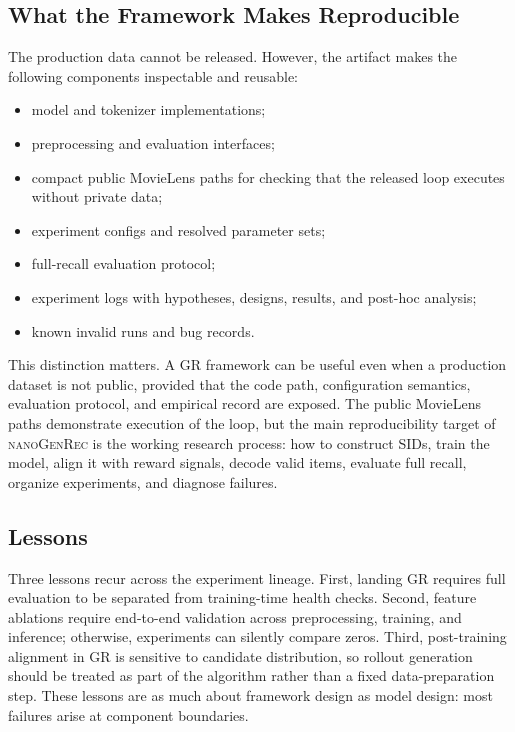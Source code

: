 \documentclass[11pt]{article}
\begin{document}
\subsection{What the Framework Makes Reproducible}

The production data cannot be released. However, the artifact makes the following components inspectable and reusable:

\begin{itemize}
  \item model and tokenizer implementations;
  \item preprocessing and evaluation interfaces;
  \item compact public MovieLens paths for checking that the released loop executes without private data;
  \item experiment configs and resolved parameter sets;
  \item full-recall evaluation protocol;
  \item experiment logs with hypotheses, designs, results, and post-hoc analysis;
  \item known invalid runs and bug records.
\end{itemize}

This distinction matters. A GR framework can be useful even when a production dataset is not public, provided that the code path, configuration semantics, evaluation protocol, and empirical record are exposed. The public MovieLens paths demonstrate execution of the loop, but the main reproducibility target of \textsc{nanoGenRec} is the working research process: how to construct SIDs, train the model, align it with reward signals, decode valid items, evaluate full recall, organize experiments, and diagnose failures.

\subsection{Lessons}

Three lessons recur across the experiment lineage. First, landing GR requires full evaluation to be separated from training-time health checks. Second, feature ablations require end-to-end validation across preprocessing, training, and inference; otherwise, experiments can silently compare zeros. Third, post-training alignment in GR is sensitive to candidate distribution, so rollout generation should be treated as part of the algorithm rather than a fixed data-preparation step. These lessons are as much about framework design as model design: most failures arise at component boundaries.
\end{document}
